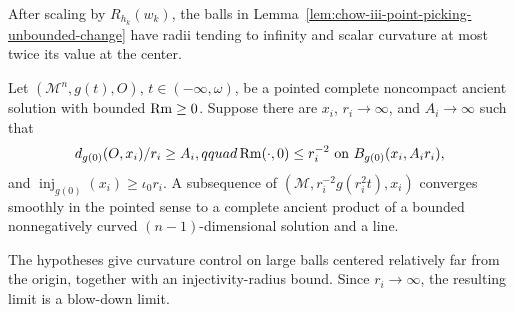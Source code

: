 \begin{remark}
\label{rem:chow-iii-unbounded-change-rescaled-balls}
After scaling by \(R_{h_k}(w_k)\), the balls in
Lemma~\ref{lem:chow-iii-point-picking-unbounded-change} have radii tending to
infinity and scalar curvature at most twice its value at the center.
\end{remark}

\begin{theorem}
\label{thm:chow-iii-dimension-reduction-one}
Let \((\mathcal M^n,g(t),O)\), \(t\in(-\infty,\omega)\), be a pointed complete
noncompact ancient solution with bounded \(\operatorname{Rm}\ge0\).  Suppose there are
\(x_i\), \(r_i\to\infty\), and \(A_i\to\infty\) such that
\[
 d_{g(0)}(O,x_i)/r_i\ge A_i,qquad
 \operatorname{Rm}(\cdot,0)\le r_i^{-2}\ \text{on }B_{g(0)}(x_i,A_ir_i),
\]
and \(\operatorname{inj}_{g(0)}(x_i)\ge\iota_0r_i\).  A subsequence of
\((\mathcal M,r_i^{-2}g(r_i^2t),x_i)\) converges smoothly in the pointed sense
to a complete ancient product of a bounded nonnegatively curved
\((n-1)\)-dimensional solution and a line.
\end{theorem}

\begin{remark}
\label{rem:chow-iii-dimension-reduction-one-interpretation}
The hypotheses give curvature control on large balls centered relatively far
from the origin, together with an injectivity-radius bound.  Since
\(r_i\to\infty\), the resulting limit is a blow-down limit.
\end{remark}

